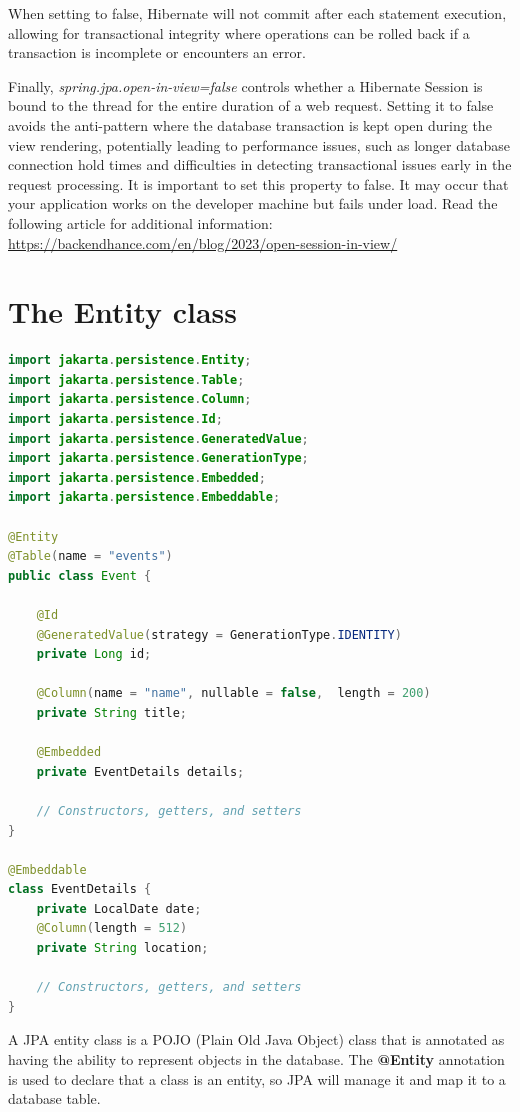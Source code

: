 When setting  to false, Hibernate will not commit after each statement execution, allowing for transactional integrity where operations can be rolled back if a transaction is incomplete or encounters an error.

Finally, \textit{spring.jpa.open-in-view=false} controls whether a Hibernate Session is bound to the thread for the entire duration of a web request. Setting it to false avoids the anti-pattern where the database transaction is kept open during the view rendering, potentially leading to performance issues, such as longer database connection hold times and difficulties in detecting transactional issues early in the request processing. It is important to set this property to false. It may occur that your application works on the developer machine but fails under load.
Read the following article for additional information:
\url{https://backendhance.com/en/blog/2023/open-session-in-view/}


\section{The Entity class}

\begin{lstlisting}[frame=single,language=java]
import jakarta.persistence.Entity;
import jakarta.persistence.Table;
import jakarta.persistence.Column;
import jakarta.persistence.Id;
import jakarta.persistence.GeneratedValue;
import jakarta.persistence.GenerationType;
import jakarta.persistence.Embedded;
import jakarta.persistence.Embeddable;

@Entity
@Table(name = "events")
public class Event {

    @Id
    @GeneratedValue(strategy = GenerationType.IDENTITY)
    private Long id;

    @Column(name = "name", nullable = false,  length = 200)
    private String title;

    @Embedded
    private EventDetails details;

    // Constructors, getters, and setters
}

@Embeddable
class EventDetails {
    private LocalDate date;
    @Column(length = 512)
    private String location;

    // Constructors, getters, and setters
}
\end{lstlisting}

A JPA entity class is a POJO (Plain Old Java Object) class  that is annotated as having the ability to represent objects in the database.
The \textbf{@Entity} annotation is used to declare that a class is an entity, so JPA will manage it and map it to a database table.


